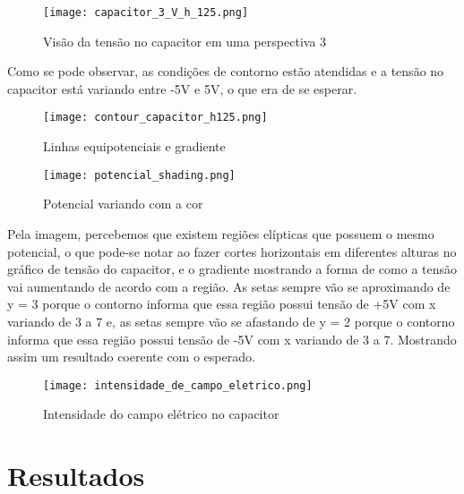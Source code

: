 \documentclass[
12pt,				%
oneside,			%
a4paper,			%
english,			%
french,				%
spanish,			%
brazil				%
]{abntex2}
\begin{document}
\begin{figure}[H]
	\begin{center}
		\texttt{[image: capacitor\_3\_V\_h\_125.png]}
		\caption{Visão da tensão no capacitor em uma perspectiva 3}
		\label{fluxograma}
	\end{center}
\end{figure}

Como se pode observar, as condições de contorno estão atendidas e a tensão no capacitor está variando entre -5V e 5V, o que era de se esperar.

\begin{figure}[H]
	\begin{center}
		\texttt{[image: contour\_capacitor\_h125.png]}
		\caption{Linhas equipotenciais e gradiente}
		\label{fluxograma}
	\end{center}
\end{figure}

\begin{figure}[H]
	\begin{center}
		\texttt{[image: potencial\_shading.png]}
		\caption{Potencial variando com a cor}
		\label{fluxograma}
	\end{center}
\end{figure}


Pela imagem, percebemos que existem regiões elípticas que possuem o mesmo potencial, o que pode-se notar ao fazer cortes horizontais em diferentes alturas no gráfico de tensão do capacitor, e o gradiente mostrando a forma de como a tensão vai aumentando de acordo com a região. As setas sempre vão se aproximando de y = 3 porque o contorno informa que essa região possui tensão de +5V com x variando de 3 a 7 e, as setas sempre vão se afastando de y = 2 porque o contorno informa que essa região possui tensão de -5V com x variando de 3 a 7. Mostrando assim um resultado coerente com o esperado.


\begin{figure}[H]
	\begin{center}
		\texttt{[image: intensidade\_de\_campo\_eletrico.png]}
		\caption{Intensidade do campo elétrico no capacitor}
		\label{fluxograma}
	\end{center}
\end{figure}



\chapter{Resultados}
\end{document}
